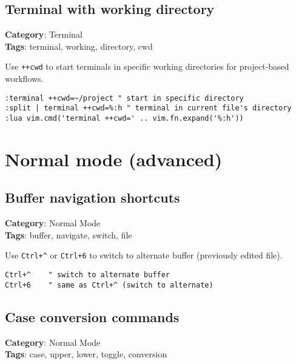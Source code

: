 {{{{{{{{{{\section{Terminal with working directory}

\textbf{Category}: Terminal\\ \textbf{Tags}: terminal, working, directory, cwd
\vspace{0.5cm}

Use {\footnotesize \Verb§++cwd§} to start terminals in specific working directories for project-based workflows.

\begin{Exa*}{}
\begin{Verbatim}[fontsize=\footnotesize, breaklines, breakanywhere]
:terminal ++cwd=~/project " start in specific directory
:split | terminal ++cwd=%:h " terminal in current file's directory
:lua vim.cmd('terminal ++cwd=' .. vim.fn.expand('%:h'))
\end{Verbatim}
\end{Exa*}

\chapter{Normal mode (advanced)}
\section{Buffer navigation shortcuts}

\textbf{Category}: Normal Mode\\ \textbf{Tags}: buffer, navigate, switch, file
\vspace{0.5cm}

Use {\footnotesize \Verb§Ctrl+^§} or {\footnotesize \Verb§Ctrl+6§} to switch to alternate buffer (previously edited file).

\begin{Exa*}{}
\begin{Verbatim}[fontsize=\footnotesize, breaklines, breakanywhere]
Ctrl+^    " switch to alternate buffer
Ctrl+6    " same as Ctrl+^ (switch to alternate)
\end{Verbatim}
\end{Exa*}

\section{Case conversion commands}

\textbf{Category}: Normal Mode\\ \textbf{Tags}: case, upper, lower, toggle, conversion
\vspace{0.5cm}

}}}}}}}}}}
